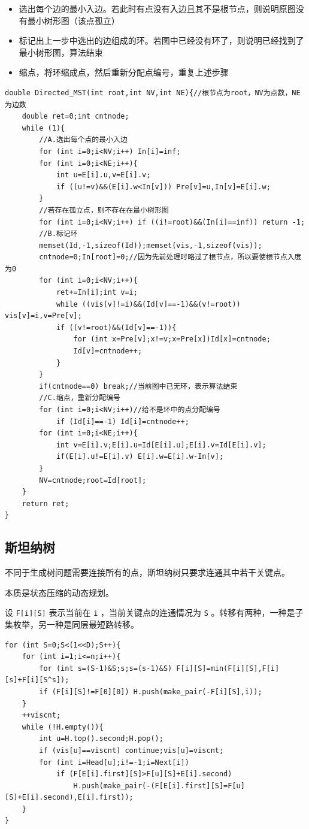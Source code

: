 \documentclass[UTF-8]{ctexart}
\begin{document}
	\begin{itemize}
		\item 选出每个边的最小入边。若此时有点没有入边且其不是根节点，则说明原图没有最小树形图（该点孤立）
		\item 标记出上一步中选出的边组成的环。若图中已经没有环了，则说明已经找到了最小树形图，算法结束
		\item 缩点，将环缩成点，然后重新分配点编号，重复上述步骤
	\end{itemize}
\begin{verbatim}
double Directed_MST(int root,int NV,int NE){//根节点为root，NV为点数，NE为边数
    double ret=0;int cntnode;
    while (1){
        //A.选出每个点的最小入边
        for (int i=0;i<NV;i++) In[i]=inf;
        for (int i=0;i<NE;i++){
            int u=E[i].u,v=E[i].v;
            if ((u!=v)&&(E[i].w<In[v])) Pre[v]=u,In[v]=E[i].w;
        }
        //若存在孤立点，则不存在在最小树形图
        for (int i=0;i<NV;i++) if ((i!=root)&&(In[i]==inf)) return -1;
        //B.标记环
        memset(Id,-1,sizeof(Id));memset(vis,-1,sizeof(vis));
        cntnode=0;In[root]=0;//因为先前处理时略过了根节点，所以要使根节点入度为0
        for (int i=0;i<NV;i++){
            ret+=In[i];int v=i;
            while ((vis[v]!=i)&&(Id[v]==-1)&&(v!=root)) vis[v]=i,v=Pre[v];
            if ((v!=root)&&(Id[v]==-1)){
                for (int x=Pre[v];x!=v;x=Pre[x])Id[x]=cntnode;
                Id[v]=cntnode++;
            }
        }
        if(cntnode==0) break;//当前图中已无环，表示算法结束
        //C.缩点，重新分配编号
        for (int i=0;i<NV;i++)//给不是环中的点分配编号
            if (Id[i]==-1) Id[i]=cntnode++;
        for (int i=0;i<NE;i++){
            int v=E[i].v;E[i].u=Id[E[i].u];E[i].v=Id[E[i].v];
            if(E[i].u!=E[i].v) E[i].w=E[i].w-In[v];
        }
        NV=cntnode;root=Id[root];
    }
    return ret;
}
\end{verbatim}
	\subsection{斯坦纳树}
	不同于生成树问题需要连接所有的点，斯坦纳树只要求连通其中若干关键点。
	
	本质是状态压缩的动态规划。
	
	设 \texttt{F[i][S]} 表示当前在 \texttt{i} ，当前关键点的连通情况为 \texttt{S} 。转移有两种，一种是子集枚举，另一种是同层最短路转移。
\begin{verbatim}
for (int S=0;S<(1<<D);S++){
    for (int i=1;i<=n;i++){
        for (int s=(S-1)&S;s;s=(s-1)&S) F[i][S]=min(F[i][S],F[i][s]+F[i][S^s]);
        if (F[i][S]!=F[0][0]) H.push(make_pair(-F[i][S],i));
    }
    ++viscnt;
    while (!H.empty()){
        int u=H.top().second;H.pop();
        if (vis[u]==viscnt) continue;vis[u]=viscnt;
        for (int i=Head[u];i!=-1;i=Next[i])
            if (F[E[i].first][S]>F[u][S]+E[i].second)
                H.push(make_pair(-(F[E[i].first][S]=F[u][S]+E[i].second),E[i].first));
    }
}
\end{verbatim}
\end{document}
